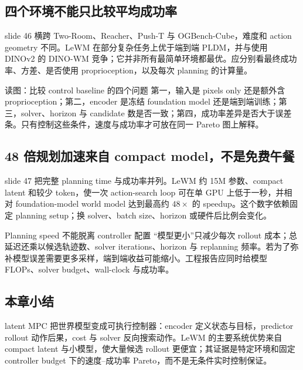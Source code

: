 \subsection{四个环境不能只比较平均成功率}

slide 46 横跨 Two-Room、Reacher、Push-T 与 OGBench-Cube，难度和 action geometry 不同。LeWM 在部分复杂任务上优于端到端 PLDM，并与使用 DINOv2 的 DINO-WM 竞争；它并非所有最简单环境都最优。应分别看最终成功率、方差、是否使用 proprioception，以及每次 planning 的计算量。


\begin{knowledgebox}{读图：比较 control baseline 的四个问题}
第一，输入是 pixels only 还是额外含 proprioception；第二，encoder 是冻结 foundation model 还是端到端训练；第三，solver、horizon 与 candidate 数是否一致；第四，成功率差异是否大于误差条。只有控制这些条件，速度与成功率才可放在同一 Pareto 图上解释。
\end{knowledgebox}

\subsection{48 倍规划加速来自 compact model，不是免费午餐}

slide 47 把完整 planning time 与成功率并列。LeWM 约 15M 参数、compact latent 和较少 token，使一次 action-search loop 可在单 GPU 上低于一秒，并相对 foundation-model world model 达到最高约 $48\times$ 的 speedup。这个数字依赖固定 planning setup；换 solver、batch size、horizon 或硬件后比例会变化。



\begin{warningbox}{Planning speed 不能脱离 controller 配置}
``模型更小''只减少每次 rollout 成本；总延迟还乘以候选轨迹数、solver iterations、horizon 与 replanning 频率。若为了弥补模型误差需要更多采样，端到端收益可能缩小。工程报告应同时给模型 FLOPs、solver budget、wall-clock 与成功率。
\end{warningbox}

\subsection{本章小结}

latent MPC 把世界模型变成可执行控制器：encoder 定义状态与目标，predictor rollout 动作后果，cost 与 solver 反向搜索动作。LeWM 的主要系统优势来自 compact latent 与小模型，使大量候选 rollout 更便宜；其证据是特定环境和固定 controller budget 下的速度--成功率 Pareto，而不是无条件实时控制保证。

